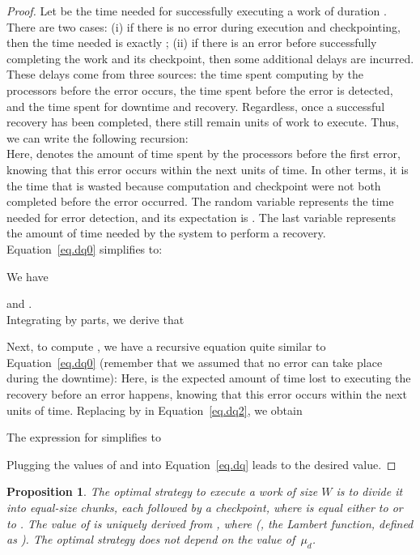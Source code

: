 \documentclass[10pt,table]{article}
\newtheorem{proposition}{Proposition}
\newcommand{\ema}[1]{\ensuremath{#1}\xspace}
\newcommand{\WWW}{\ema{W}}
\newcommand{\mud}{\ema{\mu_{d}}}
\begin{document}
\begin{proof}
Let  be the time needed for successfully executing a work of duration .
There are two cases: (i) if there is no error during execution and checkpointing, then the time needed is
exactly ; (ii) if there is an error before successfully completing  the work and its checkpoint, then some additional delays 
are incurred. These delays come from three sources: the time spent
computing by the processors before the error occurs,  the time spent before the error is detected, and the time spent for downtime and recovery. 
Regardless, once a successful recovery has been completed,
 there still remain  units of work to execute. 
Thus, we can write the following recursion: \\


Here,  denotes the amount of time spent by the processors before the first error, knowing that this
error occurs within the next  units of time. In other terms, it is the
time that is wasted because computation and checkpoint were not both
completed before the error occurred.
The random variable  represents the time needed for error detection, and its expectation is 
.
The last variable  represents the amount of time needed by the
system to perform a recovery. 
Equation~\eqref{eq.dq0} simplifies to:

We have 
{\small 

}
 and .  \\ 
Integrating by parts, we derive that 

Next, to compute , we have a recursive equation quite similar to Equation~\eqref{eq.dq0}
(remember that we assumed that no error can take place during the downtime):
{\small 
}
Here,  is the expected amount of time lost to executing
the recovery before an error happens, knowing that this
error occurs within the next  units of time. Replacing  by  in Equation~\eqref{eq.dq2},
we obtain

The expression for  
 simplifies to

Plugging the values of  and   into Equation~\eqref{eq.dq} leads to the desired value.
\end{proof}

\begin{proposition}
\label{th.work2}
The optimal strategy to execute a work of size \WWW is to divide it into  equal-size
chunks, each followed by a checkpoint, where  is equal either to   or
to . The value of  is uniquely derived from , where  (, the Lambert function, 
defined as ).
The optimal strategy does not depend on the value of~\mud.
\end{proposition}
\end{document}
